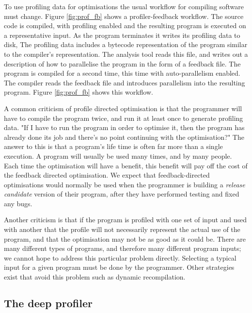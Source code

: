 
To use profiling data for optimisations the usual workflow for compiling
software must change.
Figure \ref{fig:prof_fb} shows a profiler-feedback workflow.
The source code is compiled, with profiling enabled and the resulting program is
executed on a representative input.
As the program terminates it writes its profiling data to disk,
The profiling data includes a bytecode representation of the program
similar to the compiler's representation.
The analysis tool reads this file,
and writes out a description of how to parallelise the program in the form of a
feedback file.
The program is compiled for a second time,
this time with auto-parallelism enabled.
The compiler reads the feedback file and introduces parallelism into the
resulting program.
Figure \ref{fig:prof_fb} shows this workflow.

A common criticism of profile directed optimisation is that the programmer will
have to compile the program twice,
and run it at least once to generate profiling data.
"If I have to run the program in order to optimise it, then the program has
already
done its job and there's no point continuing with the optimisation?"
The answer to this is that a program's life time is often far more than a
single execution.
A program will usually be used many times, and by many people.
Each time the optimisation will have a benefit,
this benefit will pay off the cost of the feedback directed optimisation.
We expect that feedback-directed optimisations would normally be used
when the programmer is building a \emph{release candidate} version of their
program,
after they have performed testing and fixed any bugs.

Another criticism is that if the program is profiled with one set of input and
used with another that the profile will not necessarily represent the actual use
of the program,
and that the optimisation may not be as good as it could be.
There are many different types of programs, and therefore many different
program inputs;
we cannot hope to address this particular problem directly.
Selecting a typical input for a given program must be done by the programmer.
Other strategies exist that avoid this problem
such as dynamic recompilation.

\subsection{The deep profiler}
\label{sec:backgnd_deep}

